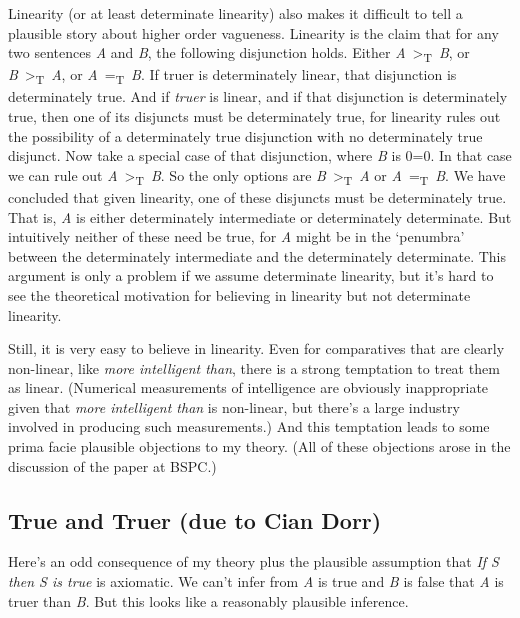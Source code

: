 \documentclass[
  10pt,
  letterpaper,
  DIV=11,
  numbers=noendperiod,
  twoside]{scrartcl}
\begin{document}
Linearity (or at least determinate linearity) also makes it difficult to
tell a plausible story about higher order vagueness. Linearity is the
claim that for any two sentences \emph{A} and \emph{B}, the following
disjunction holds. Either
\emph{A}~\textgreater{}\textsubscript{T}~\emph{B}, or
\emph{B}~\textgreater{}\textsubscript{T}~\emph{A}, or
\emph{A}~=\textsubscript{T}~\emph{B}. If truer is determinately linear,
that disjunction is determinately true. And if \emph{truer} is linear,
and if that disjunction is determinately true, then one of its disjuncts
must be determinately true, for linearity rules out the possibility of a
determinately true disjunction with no determinately true disjunct. Now
take a special case of that disjunction, where \emph{B} is 0=0. In that
case we can rule out \emph{A}~\textgreater{}\textsubscript{T}~\emph{B}.
So the only options are
\emph{B}~\textgreater{}\textsubscript{T}~\emph{A} or
\emph{A}~=\textsubscript{T}~\emph{B}. We have concluded that given
linearity, one of these disjuncts must be determinately true. That is,
\emph{A} is either determinately intermediate or determinately
determinate. But intuitively neither of these need be true, for \emph{A}
might be in the `penumbra' between the determinately intermediate and
the determinately determinate. This argument is only a problem if we
assume determinate linearity, but it's hard to see the theoretical
motivation for believing in linearity but not determinate linearity.

Still, it is very easy to believe in linearity. Even for comparatives
that are clearly non-linear, like \emph{more intelligent than}, there is
a strong temptation to treat them as linear. (Numerical measurements of
intelligence are obviously inappropriate given that \emph{more
intelligent than} is non-linear, but there's a large industry involved
in producing such measurements.) And this temptation leads to some prima
facie plausible objections to my theory. (All of these objections arose
in the discussion of the paper at BSPC.)

\subsection*{True and Truer (due to Cian
Dorr)}\label{true-and-truer-due-to-cian-dorr}

Here's an odd consequence of my theory plus the plausible assumption
that \emph{If S then S is true} is axiomatic. We can't infer from
\emph{A} is true and \emph{B} is false that \emph{A} is truer than
\emph{B}. But this looks like a reasonably plausible inference.
\end{document}
